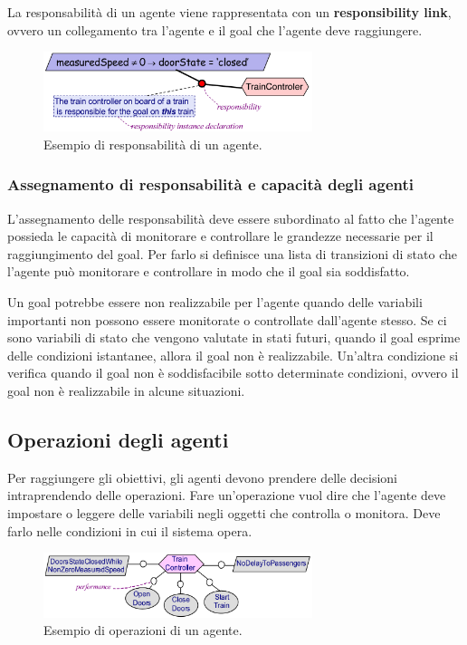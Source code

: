\begin{tcolorbox}[colback=violet!5!white,colframe=violet!75!black, title=Responsabilità di un agente]
    La responsabilità di un agente viene rappresentata con un \textbf{responsibility link}, ovvero 
    un collegamento tra l'agente e il goal che l'agente deve raggiungere.
\end{tcolorbox}
\begin{figure}[H]
    \centering
    \includegraphics[width=0.7\textwidth]{img/responsibility.png}
    \caption{Esempio di responsabilità di un agente.}
    \label{fig:responsibility}
\end{figure}
\subsubsection{Assegnamento di responsabilità e capacità degli agenti}
L'assegnamento delle responsabilità deve essere subordinato al fatto che l'agente 
possieda le capacità di monitorare e controllare le grandezze necessarie
per il raggiungimento del goal.
Per farlo si definisce una lista di transizioni di stato che l'agente può monitorare e controllare in 
modo che il goal sia soddisfatto.

Un goal potrebbe essere non realizzabile per l'agente quando delle variabili importanti 
non possono essere monitorate o controllate dall'agente stesso. Se ci sono variabili 
di stato che vengono valutate in stati futuri, quando il goal esprime delle 
condizioni istantanee, allora il goal non è realizzabile.
Un'altra condizione si verifica quando il goal non è soddisfacibile sotto determinate 
condizioni, ovvero il goal non è realizzabile in alcune situazioni.
\subsection{Operazioni degli agenti}
Per raggiungere gli obiettivi, gli agenti devono prendere delle decisioni intraprendendo 
delle operazioni.
Fare un'operazione vuol dire che l'agente deve impostare o leggere delle variabili negli 
oggetti che controlla o monitora. Deve farlo nelle condizioni in cui il 
sistema opera.
\begin{figure}[H]
    \centering
    \includegraphics[width=0.7\textwidth]{img/performance.png}
    \caption{Esempio di operazioni di un agente.}
    \label{fig:operations}
\end{figure}

